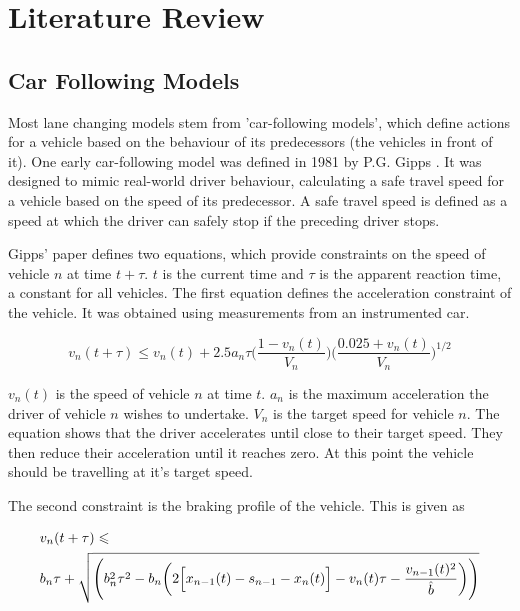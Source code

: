 \chapter{Literature Review}
\label{cha:Literature Review}

\section{Car Following Models}
\label{sec:Car Following Models}
Most lane changing models stem from 'car-following models', which define actions for a vehicle based on the behaviour of its predecessors (the vehicles in front of it). One early car-following model was defined in 1981 by P.G. Gipps \citep{Gipps1981}. It was designed to mimic real-world driver behaviour, calculating a safe travel speed for a vehicle based on the speed of its predecessor. A safe travel speed is defined as a speed at which the driver can safely stop if the preceding driver stops.

Gipps' paper defines two equations, which provide constraints on the speed of vehicle $n$ at time $t + \tau$. $t$ is the current time and $\tau$ is the apparent reaction time, a constant for all vehicles. The first equation defines the acceleration constraint of the vehicle. It was obtained using measurements from an instrumented car.

\begin{equation}\label{Gipps1981Accel}
v_n(t+\tau) \leqslant v_n(t) + 2.5a_n\tau\Biggl(\frac{1 - v_n(t)}{V_n}\Biggr)\Biggl(\frac{0.025 + v_n(t)}{V_n}\Biggr)^{1/2}
\end{equation}

$v_n(t)$ is the speed of vehicle $n$ at time $t$. $a_n$ is the maximum acceleration the driver of vehicle $n$ wishes to undertake. $V_n$ is the target speed for vehicle $n$. The equation shows that the driver accelerates until close to their target speed. They then reduce their acceleration until it reaches zero. At this point the vehicle should be travelling at it's target speed.

The second constraint is the braking profile of the vehicle. This is given as

\begin{equation}\label{Gipps1981Brake}
\begin{split}
&v_n(t+\tau) \leqslant \\
&b_n\tau + \sqrt{\Biggl(b_n^2\tau^2 - b_n\biggl(2\Bigl[x_{n-1}(t) - s_{n-1} - x_n(t)\Bigr] - v_n(t)\tau - \frac{v_{n-1}(t)^2}{\hat{b}}\biggr)\Biggr)}
\end{split}
\end{equation}

